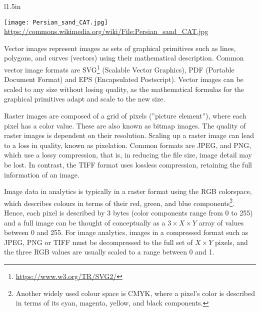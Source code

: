 \begin{wrapfigure}{l}{1.5in}
\begin{center}
\texttt{[image: Persian\_sand\_CAT.jpg]}
\scriptsize\url{https://commons.wikimedia.org/wiki/File:Persian_sand_CAT.jpg}
\end{center}
\end{wrapfigure}

Vector images represent images as sets of graphical primitives such as lines, polygons, and curves (vectors) using their mathematical description. Common vector image formats are SVG\footnote{\url{https://www.w3.org/TR/SVG2/}} (Scalable Vector Graphics), PDF (Portable Document Format) and EPS (Encapsulated Postscript). Vector images can be scaled to any size without losing quality, as the mathematical formulas for the graphical primitives adapt and scale to the new size.

Raster images are composed of a grid of pixels (''picture element''), where each pixel has a color value. These are also known as bitmap images. The quality of raster images is dependent on their resolution. Scaling up a raster image can lead to a loss in quality, known as pixelation. Common formats are JPEG, and PNG, which use a lossy compression, that is, in reducing the file size, image detail may be lost. In contrast, the TIFF format uses lossless compression, retaining the full information of an image. 

Image data in analytics is typically in a raster format using the RGB colorspace, which describes colours in terms of their red, green, and blue components\footnote{Another widely used colour space is CMYK, where a pixel's color is described in terms of its cyan, magenta, yellow, and black components.}. Hence, each pixel is described by 3 bytes (color components range from 0 to 255) and a full image can be thought of conceptually as  a $3 \times X \times Y$ array of values between 0 and 255. For image analytics, images in a compressed format such as JPEG, PNG or TIFF must be decompressed to the full set of $X \times Y$ pixels, and the three RGB values are usually scaled to a range between 0 and 1.

